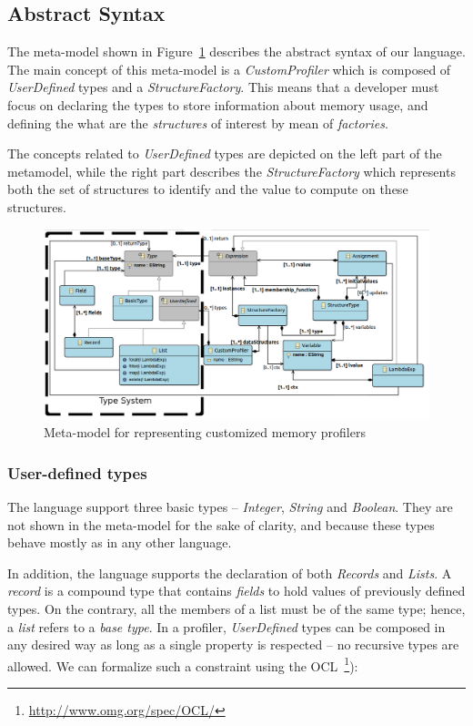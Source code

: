 \subsection{Abstract Syntax}\label{sec:abstract-syntax}

The meta-model shown in Figure~\ref{fig:as} describes the abstract syntax of our language.
The main concept of this meta-model is a \textit{CustomProfiler} which is composed of \textit{UserDefined} types and a \textit{StructureFactory}.
This means that a developer must focus on declaring the types to store information about memory usage, and defining the what are the \textit{structures} of interest by mean of \textit{factories}.

The concepts related to \textit{UserDefined} types are depicted on the left part of the metamodel, while the right part describes the \textit{StructureFactory} which represents both the set of  structures to identify and the value to compute on these structures.

\begin{figure}
\centering
\includegraphics[width=0.93\linewidth]{chapter6/fig/AS}
\caption{Meta-model for representing customized memory profilers}
\label{fig:as}
\end{figure}

\subsubsection*{User-defined types}
The language support three basic types -- \textit{Integer}, \textit{String} and \textit{Boolean}.
They are not shown in the meta-model for the sake of clarity, and because these types behave mostly as in any other language.

In addition, the language supports the declaration of both \textit{Records} and \textit{Lists}.
A \textit{record} is a compound type that contains \textit{fields} to hold values of previously defined types.
On the contrary,  all the members of a list must be of the same type; hence, a \textit{list} refers to a \textit{base type}.
In a profiler, \textit{UserDefined} types can be composed in any desired way as long as a single property is respected -- no recursive types are allowed.
We can formalize such a constraint using the \gls{OCL}~\footnote{\url{http://www.omg.org/spec/OCL/}}):


